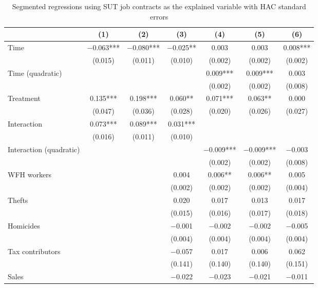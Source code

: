 \documentclass[11pt,a4paper]{article}\usepackage[]{graphicx}\usepackage[]{xcolor}
\begin{document}
\begin{table}[h]
\caption{Segmented regressions using SUT job contracts as the explained variable with HAC standard errors}
\label{app:seg}

\begin{tabular}[t]{lcccccc}
\toprule
  & (1) & (2) & (3) & (4) & (5) & (6)\\
\midrule
Time & \num{-0.063}*** & \num{-0.080}*** & \num{-0.025}** & \num{0.003} & \num{0.003} & \num{0.008}***\\
 & (\num{0.015}) & (\num{0.011}) & (\num{0.010}) & (\num{0.002}) & (\num{0.002}) & (\num{0.002})\\
Time (quadratic) &  &  &  & \num{0.009}*** & \num{0.009}*** & \num{0.003}\\
 &  &  &  & (\num{0.002}) & (\num{0.002}) & \vphantom{1} (\num{0.008})\\
Treatment & \num{0.135}*** & \num{0.198}*** & \num{0.060}** & \num{0.071}*** & \num{0.063}** & \num{0.000}\\
 & (\num{0.047}) & (\num{0.036}) & (\num{0.028}) & (\num{0.020}) & (\num{0.026}) & (\num{0.027})\\
Interaction & \num{0.073}*** & \num{0.089}*** & \num{0.031}*** &  &  & \\
 & (\num{0.016}) & (\num{0.011}) & (\num{0.010}) &  &  & \\
Interaction (quadratic) &  &  &  & \num{-0.009}*** & \num{-0.009}*** & \num{-0.003}\\
 &  &  &  & (\num{0.002}) & (\num{0.002}) & (\num{0.008})\\
WFH workers &  &  & \num{0.004} & \num{0.006}** & \num{0.006}** & \num{0.005}\\
 &  &  & (\num{0.002}) & (\num{0.002}) & (\num{0.002}) & (\num{0.004})\\
Thefts &  &  & \num{0.020} & \num{0.017} & \num{0.013} & \num{0.017}\\
 &  &  & (\num{0.015}) & (\num{0.016}) & (\num{0.017}) & (\num{0.018})\\
Homicides &  &  & \num{-0.001} & \num{-0.002} & \num{-0.002} & \num{-0.005}\\
 &  &  & (\num{0.004}) & (\num{0.004}) & (\num{0.004}) & (\num{0.004})\\
Tax contributors &  &  & \num{-0.057} & \num{0.017} & \num{0.006} & \num{0.062}\\
 &  &  & (\num{0.141}) & (\num{0.140}) & (\num{0.140}) & (\num{0.151})\\
Sales &  &  & \num{-0.022} & \num{-0.023} & \num{-0.021} & \num{-0.011}\\

\end{tabular}
\end{table}
\end{document}
